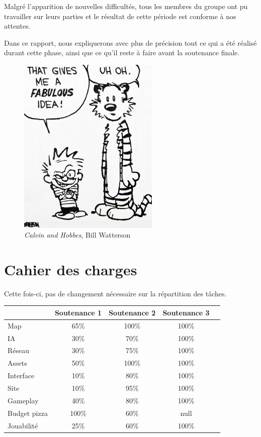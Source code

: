 \documentclass[12pt]{report}
\begin{document}
Malgré l’apparition de nouvelles difficultés, tous les membres du groupe ont pu
travailler sur leurs parties et le résultat de cette période est conforme à nos
attentes.

Dans ce rapport, nous expliquerons avec plus de précision tout ce qui a été
réalisé durant cette phase, ainsi que ce qu’il reste à faire avant la
soutenance finale.

\begin{figure}
    \centering
    \includegraphics[width=0.6\textwidth]{project_mood_S2}
    \caption*{\textit{Calvin and Hobbes}, Bill Watterson}
\end{figure}

\chapter{Cahier des charges}

Cette fois-ci, pas de changement nécessaire sur la répartition des tâches.

\vspace{1cm}

\begin{center}
    \begin{tabular}{@{} l *4c @{}}
        \toprule
        \multicolumn{1}{c}{}    & \textbf{Soutenance 1}  & \textbf{Soutenance 2}  & \textbf{Soutenance 3} \\ 
        \midrule
        Map & 65\% & 100\% & 100\% \\
        IA & 30\% & 70\% & 100\% \\
        Réseau & 30\% & 75\% & 100\% \\
        Assets & 50\% & 100\% & 100\% \\
        Interface & 10\% & 80\% & 100\% \\
        Site & 10\% & 95\% & 100\% \\
        Gameplay & 40\% & 80\% & 100\% \\
        Budget pizza & 100\% & 60\% & null\\
        \midrule
        Jouabilité & 25\% & 60\% & 100\% \\
        \bottomrule
    \end{tabular}
\end{center}
\end{document}
